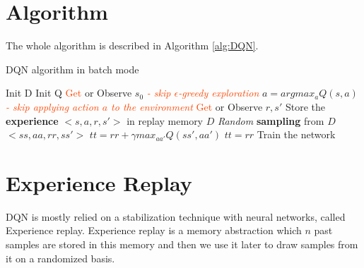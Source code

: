 \documentclass[12pt]{report}
\begin{document}
\section{Algorithm}
The whole algorithm is described in Algorithm \ref{alg:DQN}.

\begin{algorithm}[H]
\caption{DQN algorithm in batch mode}
\label{alg:DQN}
\begin{algorithmic}[1]
    \State Init D \Comment{\textcolor{BlueViolet}{replay memory}}
    \State Init Q \Comment{\textcolor{BlueViolet}{Q-table w/ random weights}}
    \State \textcolor{OrangeRed}{Get} or Observe $s_0$ \Comment{\textcolor{BlueViolet}{the initial state}}
            \State \textit{\textcolor{OrangeRed}{- skip $\epsilon$-greedy exploration}}
            \State $a = argmax_a Q(s,a)$
            \State \textit{\textcolor{OrangeRed}{- skip applying action $a$ to the environment}}
            \State \textcolor{OrangeRed}{Get} or Observe $r, s'$
            \State Store the \textbf{experience} $<s, a, r, s'>$ in replay memory $D$
            \State \textit{Random} \textbf{sampling} from $D$ $<ss, aa, rr, ss'>$  \Comment{\textcolor{BlueViolet}{[mini]-batch}}
             \Comment{\textcolor{BlueViolet}{target for each mini-batch}}
                \State $tt = rr + \gamma max_{aa'} Q(ss', aa')$
            \Else
                \State $tt = rr$
            \EndIf
            \State Train the network
        \EndFor    
    \EndFor
\end{algorithmic}
\end{algorithm}

\section{Experience Replay}
DQN is mostly relied on a stabilization technique with neural networks, called Experience replay. Experience replay is a memory abstraction which $n$ past samples are stored in this memory and then we use it later to draw samples from it on a randomized basis. 



\end{document}
